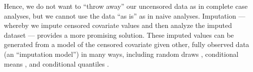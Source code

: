 \documentclass[12pt]{article}
\begin{document}
Hence, we do not want to ``throw away'' our uncensored data as in complete case analyses, but we cannot use the data ``as is'' as in naive analyses. Imputation --- whereby we impute censored covariate values and then analyze the imputed dataset --- provides a more promising solution. 
These imputed values can be generated from a model of the censored covariate given other, fully observed data (an ``imputation model'') in many ways, including random draws \citep{Bernhardt2014, Wei2018}, conditional means \citep{Atem2019}, and conditional quantiles \citep{Wang2012, yu2021quantile}. 
\end{document}
